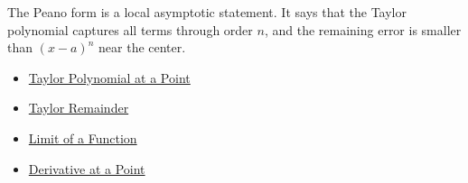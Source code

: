 \begin{remark*}[Interpretation]
The Peano form is a local asymptotic statement. It says that the Taylor
polynomial captures all terms through order $n$, and the remaining error is
smaller than $(x-a)^n$ near the center.
\end{remark*}

\begin{remark*}[Dependencies]\hfill
\begin{itemize}
  \item \hyperref[def:taylor-polynomial-at-a-point]{Taylor Polynomial at a Point}
  \item \hyperref[def:taylor-remainder]{Taylor Remainder}
  \item \hyperref[def:limit-function]{Limit of a Function}
  \item \hyperref[def:derivative-at-a-point]{Derivative at a Point}
\end{itemize}
\end{remark*}